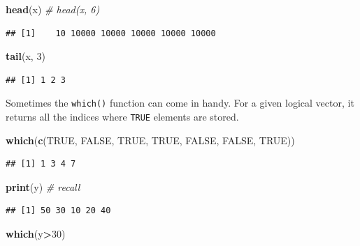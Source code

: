 \documentclass[10pt,b5paper,krantz1]{krantz}
\newenvironment{Shaded}{\begin{snugshade}}{\end{snugshade}}
\newcommand{\CommentTok}[1]{\textcolor[rgb]{0.37,0.37,0.37}{\textit{#1}}}
\newcommand{\DecValTok}[1]{\textcolor[rgb]{0.06,0.06,0.06}{#1}}
\newcommand{\KeywordTok}[1]{\textcolor[rgb]{0.27,0.27,0.27}{\textbf{#1}}}
\newcommand{\NormalTok}[1]{#1}
\newcommand{\OperatorTok}[1]{\textcolor[rgb]{0.43,0.43,0.43}{\textbf{#1}}}
\newcommand{\OtherTok}[1]{\textcolor[rgb]{0.37,0.37,0.37}{#1}}
\begin{document}
\begin{Shaded}
\begin{Highlighting}[]
\KeywordTok{head}\NormalTok{(x) }\CommentTok{# head(x, 6)}
\end{Highlighting}
\end{Shaded}

\begin{verbatim}
## [1]    10 10000 10000 10000 10000 10000
\end{verbatim}

\begin{Shaded}
\begin{Highlighting}[]
\KeywordTok{tail}\NormalTok{(x, }\DecValTok{3}\NormalTok{)}
\end{Highlighting}
\end{Shaded}

\begin{verbatim}
## [1] 1 2 3
\end{verbatim}

Sometimes the \texttt{which()} function can come in handy.
For a given logical vector, it returns all the indices
where \texttt{TRUE} elements are stored.

\begin{Shaded}
\begin{Highlighting}[]
\KeywordTok{which}\NormalTok{(}\KeywordTok{c}\NormalTok{(}\OtherTok{TRUE}\NormalTok{, }\OtherTok{FALSE}\NormalTok{, }\OtherTok{TRUE}\NormalTok{, }\OtherTok{TRUE}\NormalTok{, }\OtherTok{FALSE}\NormalTok{, }\OtherTok{FALSE}\NormalTok{, }\OtherTok{TRUE}\NormalTok{))}
\end{Highlighting}
\end{Shaded}

\begin{verbatim}
## [1] 1 3 4 7
\end{verbatim}

\begin{Shaded}
\begin{Highlighting}[]
\KeywordTok{print}\NormalTok{(y) }\CommentTok{# recall}
\end{Highlighting}
\end{Shaded}

\begin{verbatim}
## [1] 50 30 10 20 40
\end{verbatim}

\begin{Shaded}
\begin{Highlighting}[]
\KeywordTok{which}\NormalTok{(y}\OperatorTok{>}\DecValTok{30}\NormalTok{)}
\end{Highlighting}
\end{Shaded}
\end{document}

